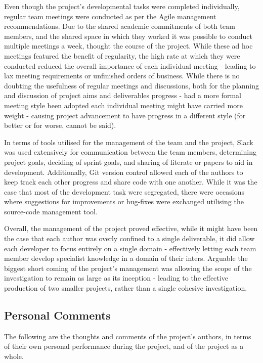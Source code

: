 Even though the project's developmental tasks were completed individually,
regular team meetings were conducted as per the Agile management
recommendations.
Due to the shared academic commitments of both team members, and the shared
space in which they worked it was possible to conduct multiple meetings a
week, thought the course of the project.
While these ad hoc meetings featured the benefit of regularity, the high rate
at which they were conducted reduced the overall importance of each individual
meeting - leading to lax meeting requirements or unfinished orders of business.
While there is no doubting the usefulness of regular meetings and discussions,
both for the planning and discussion of project aims and deliverables
progress - had a more formal meeting style been adopted each individual meeting
might have carried more weight - causing project advancement to have progress
in a different style (for better or for worse, cannot be said).

In terms of tools utilised for the management of the team and the project,
Slack was used extensively for communication between the team members,
determining project goals, deciding of sprint goals, and sharing of literate
or papers to aid in development.
Additionally, Git version control allowed each of the authors to keep track
each other progress and share code with one another.
While it was the case that most of the development task were segregated, there
were occasions where suggestions for improvements or bug-fixes were exchanged
utilising the source-code management tool.

Overall, the management of the project proved effective, while it might have
been the case that each author was overly confined to a single deliverable,
it did allow each developer to focus entirely on a single domain - effectively
letting each team member develop specialist knowledge in a domain of their
inters.
Arguable the biggest short coming of the project's management was allowing
the scope of the investigation to remain as large as its inception - leading
to the effective production of two smaller projects, rather than a single
cohesive investigation.

\subsection{Personal Comments}
The following are the thoughts and comments of the project's authors,
in terms of their own personal performance during the project, and of the
project as a whole.

